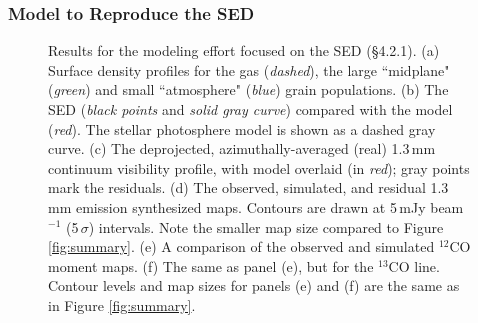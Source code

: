 {\subsubsection{Model to Reproduce the SED}\label{sec:model1}

\begin{figure}[t!]
\caption{Results for the modeling effort focused on the SED (\S 4.2.1).  (a)
Surface density profiles for the gas ({\it dashed}), the large ``midplane"
({\it green}) and small ``atmosphere" ({\it blue}) grain populations.  (b) The
SED ({\it black points} and {\it solid gray curve}) compared with the model
({\it red}).  The stellar photosphere model is shown as a dashed gray curve.
(c) The deprojected, azimuthally-averaged (real) 1.3\,mm continuum visibility
profile, with model overlaid (in {\it red}); gray points mark the residuals.
(d) The observed, simulated, and residual 1.3\,mm emission synthesized maps.
Contours are drawn at 5\,mJy beam$^{-1}$ (5\,$\sigma$) intervals.  Note the
smaller map size compared to Figure \ref{fig:summary}.  (e) A comparison of the
observed and simulated $^{12}$CO moment maps.  (f) The same as panel (e), but
for the $^{13}$CO line.  Contour levels and map sizes for panels (e) and (f)
are the same as in Figure \ref{fig:summary}.  \label{fig:modsum1}}
\end{figure}

}
